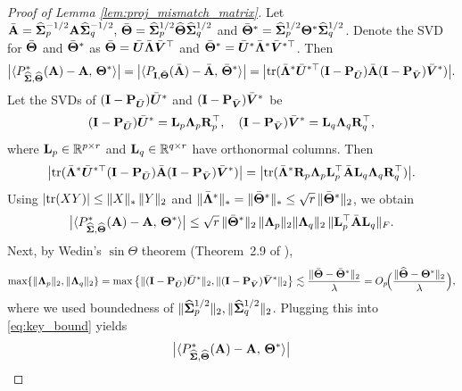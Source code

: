 \documentclass[authoryear,preprint,review,12pt]{elsarticle}
\begin{document}
\begin{proof}[Proof of Lemma \ref{lem:proj_mismatch_matrix}]
	Let $\bar{\mathbf{A}} =  \widehat{\mathbf{ \Sigma}}_p^{-1/2}\mathbf{A}\widehat{\mathbf{ \Sigma}}_q^{-1/2},\,\bar{\mathbf{\Theta}} = \widehat{\mathbf{ \Sigma}}_p^{1/2}\widehat{\mathbf{\Theta}} \widehat{\mathbf{ \Sigma}}_q^{1/2}$ and $\bar {\mathbf{\Theta}}^\ast =  \widehat{\mathbf{ \Sigma}}_p^{1/2} \mathbf{\Theta}^\ast \widehat{\mathbf{ \Sigma}}_q^{1/2}$.  Denote the SVD for $\bar{\mathbf{\Theta}}$ and $\bar{\mathbf{\Theta}}^\ast$ as  $\bar{\mathbf{\Theta}} = \bar{\boldsymbol U}\bar{\boldsymbol \Lambda}\bar{\boldsymbol V}^{\top}$  and  $\bar{\mathbf{\Theta}}^\ast = \bar{\boldsymbol U}^\ast\bar{\boldsymbol \Lambda}^\ast\bar{\boldsymbol V}^{\ast\top}$.
	Then
	\[
	\big|\langle 
	P_{\widehat{\mathbf{ \Sigma}},\widehat{\mathbf{\Theta}}}^\ast(\mathbf{A})-\mathbf{A},\, \mathbf{\Theta}^\ast \rangle\big|
	=
	\big|\langle  P_{\mathbf{I}, \bar{\mathbf{\Theta}}}(\bar{\mathbf{A}})- \bar{\mathbf{A}},\, \bar{\mathbf{\Theta}}^\ast  \rangle\big|=
	\big|\mbox{tr}( \bar{\boldsymbol \Lambda}^\ast\bar{\boldsymbol U}^{\ast\top}(\mathbf{I} - \mathbf{P}_{\bar{\boldsymbol U}})\bar{\mathbf{A}}(\mathbf{I} - \mathbf{P}_{\bar{\boldsymbol V}})\bar{\boldsymbol V}^\ast)\big|.
	\]
	Let the SVDs of $(\mathbf{I} - \mathbf{P}_{\bar{\boldsymbol U}})\bar{\boldsymbol U}^\ast$ and $(\mathbf{I} - \mathbf{P}_{\bar{\boldsymbol V}})\bar{\boldsymbol V}^\ast$ be
	\[
	(\mathbf{I} - \mathbf{P}_{\bar{\boldsymbol U}})\bar{\boldsymbol U}^\ast = \mathbf{L}_p \boldsymbol \Lambda_p \mathbf{R}_p^{\top}, \quad
	(\mathbf{I} - \mathbf{P}_{\bar{\boldsymbol V}})\bar{\boldsymbol V}^\ast = \mathbf{L}_q \boldsymbol \Lambda_q \mathbf{R}_q^{\top},
	\]
	where $\mathbf{L}_p\in\mathbb{R}^{p\times r}$ and $\mathbf{L}_q\in\mathbb{R}^{q\times r}$ have orthonormal columns.
	Then
	\[
	\big|\mbox{tr}( \bar{\boldsymbol \Lambda}^\ast\bar{\boldsymbol U}^{\ast\top}(\mathbf{I} - \mathbf{P}_{\bar{\boldsymbol U}})\bar{\mathbf{A}}(\mathbf{I} - \mathbf{P}_{\bar{\boldsymbol V}})\bar{\boldsymbol V}^\ast)\big|
	=
	\big|\mbox{tr} (\bar{\boldsymbol \Lambda}^\ast \mathbf{R}_p\boldsymbol \Lambda_p\mathbf{L}_p^{\top}\bar{\mathbf{A}}\mathbf{L}_q\boldsymbol \Lambda_q\mathbf{R}_q^{\top})\big|.
	\]
	Using $|\mbox{tr}(XY)|\le \|X\|_*\,\|Y\|_2$ and $\| \bar{\boldsymbol \Lambda}^\ast\|_*=\|\bar{\mathbf{\Theta}}^\ast\|_*\le \sqrt r\,\|\bar{\mathbf{\Theta}}^\ast\|_2$, we obtain
	\begin{equation}
		\label{eq:key_bound}
		\big|\langle 
		P_{\widehat{\mathbf{ \Sigma}},\widehat{\mathbf{\Theta}}}^\ast(\mathbf{A})-\mathbf{A},\, \mathbf{\Theta}^\ast \rangle\big|
		\le
		\sqrt r\,\|\bar{\mathbf{\Theta}}^\ast\|_2 \,\|\boldsymbol \Lambda_p\|_2  \|\boldsymbol \Lambda_q\|_2 \,\|\mathbf{L}_p^{\top}\bar{\mathbf{A}}\mathbf{L}_q\|_F.
	\end{equation}
	Next, by Wedin's $\sin\Theta$ theorem (Theorem~2.9 of \citet{chen2021spectral}),
	\[
	\max\{\|\boldsymbol \Lambda_p\|_2,\|\boldsymbol \Lambda_q\|_2\}
	=
	\max\big\{\|(\mathbf{I} - \mathbf{P}_{\bar{\boldsymbol U}})\bar{\boldsymbol U}^\ast\|_2 , \|(\mathbf{I} - \mathbf{P}_{\bar{\boldsymbol V}})\bar{\boldsymbol V}^\ast\|_2\big\}
	\lesssim
	\frac{\|\bar{\mathbf{\Theta}}-\bar{\mathbf{\Theta}}^\ast\|_2}{\lambda}
	=
	O_p\!\Big(\frac{\|\widehat{\mathbf{\Theta}}-\mathbf{\Theta}^\ast\|_2}{\lambda}\Big),
	\]
	where we used boundedness of $\|\widehat{\mathbf{ \Sigma}}_p^{1/2}\|_2,\|\widehat{\mathbf{ \Sigma}}_q^{1/2}\|_2$.
	Plugging this into \eqref{eq:key_bound} yields
	\begin{equation}
		\label{eq:pre_alignment}
		\big|\langle 
		P_{\widehat{\bSigma},\widehat{\bTheta}}^\ast(\bA)-\bA,\, \bTheta^\ast \rangle\big|

\end{equation}
\end{proof}
\end{document}
